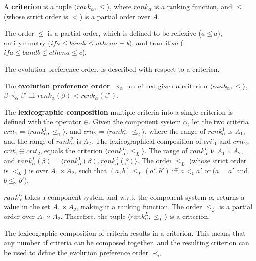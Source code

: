 \begin{defs}
\label{formal.defcriteria}
A \textbf{criterion} is a tuple $\langle rank_{\alpha}, \leq \rangle$, where $rank_{\alpha}$ is a ranking function, and $\leq$ (whose strict order is $<$) is a partial order over $A$.
\end{defs}
The order $\leq$ is a partial order, which is defined to be reflexive ($a \leq a$), antisymmetry ($if a \leq b and b \leq a then a = b$), and transitive ($if a \leq b and b \leq c then a \leq c$).

The evolution preference order, is described with respect to a criterion.
\begin{defs}
\label{formal.defcrittooptimal}
The \textbf{evolution preference order} $\prec_{\alpha}$ is defined given a criterion $\langle rank_{\alpha}, \leq \rangle$, 
$\beta \prec_{\alpha} \beta'$ iff $rank_{\alpha}(\beta) < rank_{\alpha}(\beta')$.
\end{defs}


\begin{defs}
\label{formal.defcritlex}
The \textbf{lexicographic composition} multiple criteria into a single criterion is defined with the operator $\oplus$.
Given the component system $\alpha$, let the two criteria $crit_1 = \langle rank^1_{\alpha}, \leq_{1} \rangle$, and $crit_2 = \langle rank^1_{\alpha}, \leq_{2} \rangle$,
where the range of $rank^1_{\alpha}$ is $A_1$, and the range of $rank^2_{\alpha}$ is $A_2$.
The lexicographical composition of $crit_1$ and $crit_2$, $crit_1 \oplus crit_2$, equals the criterion $\langle rank^L_{\alpha},\leq_L \rangle$.
The range of $rank^L_{\alpha}$ is $A_1 \times A_2$, and $rank^L_{\alpha}(\beta) = \langle rank^1_{\alpha}(\beta),rank^2_{\alpha}(\beta) \rangle$.
The order $\leq_L$ (whose strict order is $<_L$) is over $A_1 \times A_2$, such that $(a,b) \leq_L (a',b')$ iff $a <_1 a'$ or $(a = a'$ and $b \leq_2 b')$.
\end{defs}
$rank^L_{\alpha}$ takes a component system and w.r.t. the component system $\alpha$, returns a value in the set $A_1 \times A_2$, making it a ranking function.
The order $\leq_L$ is a partial order \citep{Schroder2003} over $A_1 \times A_2$.
Therefore, the tuple  $\langle rank^L_{\alpha},\leq_L \rangle$ is a criterion.

The lexicographic composition of criteria results in a criterion.
This means that any number of criteria can be composed together, and the resulting criterion can be used to define the evolution preference order $\prec_{\alpha}$


